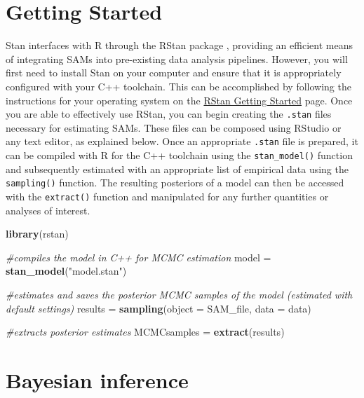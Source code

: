 \documentclass[
]{book}
\newenvironment{Shaded}{\begin{snugshade}}{\end{snugshade}}
\newcommand{\CommentTok}[1]{\textcolor[rgb]{0.56,0.35,0.01}{\textit{#1}}}
\newcommand{\DataTypeTok}[1]{\textcolor[rgb]{0.13,0.29,0.53}{#1}}
\newcommand{\KeywordTok}[1]{\textcolor[rgb]{0.13,0.29,0.53}{\textbf{#1}}}
\newcommand{\NormalTok}[1]{#1}
\newcommand{\StringTok}[1]{\textcolor[rgb]{0.31,0.60,0.02}{#1}}
\begin{document}
\hypertarget{getting-started}{%
\section{Getting Started}\label{getting-started}}

Stan interfaces with R through the RStan package \citep{Stan}, providing an efficient means of integrating SAMs into pre-existing data analysis pipelines. However, you will first need to install Stan on your computer and ensure that it is appropriately configured with your C++ toolchain. This can be accomplished by following the instructions for your operating system on the \href{https://github.com/stan-dev/rstan/wiki/RStan-Getting-Started}{RStan Getting Started} page. Once you are able to effectively use RStan, you can begin creating the \texttt{.stan} files necessary for estimating SAMs. These files can be composed using RStudio or any text editor, as explained below. Once an appropriate \texttt{.stan} file is prepared, it can be compiled with R for the C++ toolchain using the \texttt{stan\_model()} function and subsequently estimated with an appropriate list of empirical data using the \texttt{sampling()} function. The resulting posteriors of a model can then be accessed with the \texttt{extract()} function and manipulated for any further quantities or analyses of interest.

\begin{Shaded}
\begin{Highlighting}[]
\KeywordTok{library}\NormalTok{(rstan)}

\CommentTok{#compiles the model in C++ for MCMC estimation}
\NormalTok{model =}\StringTok{ }\KeywordTok{stan_model}\NormalTok{(}\StringTok{"model.stan"}\NormalTok{)}

\CommentTok{#estimates and saves the posterior MCMC samples of the model (estimated with default settings)}
\NormalTok{results =}\StringTok{ }\KeywordTok{sampling}\NormalTok{(}\DataTypeTok{object =}\NormalTok{ SAM_file, }\DataTypeTok{data =}\NormalTok{ data)}

\CommentTok{#extracts posterior estimates}
\NormalTok{MCMCsamples =}\StringTok{  }\KeywordTok{extract}\NormalTok{(results)}
\end{Highlighting}
\end{Shaded}

\hypertarget{bayesian-inference}{%
\section{Bayesian inference}\label{bayesian-inference}}
\end{document}

